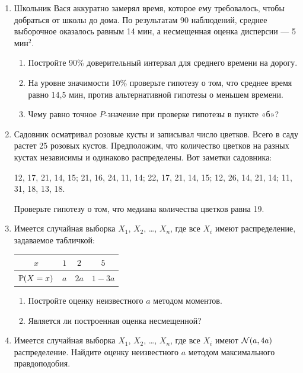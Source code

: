 \begin{enumerate}
\item Школьник Вася аккуратно замерял время, которое ему требовалось, чтобы добраться от школы до дома. По результатам 90 наблюдений, среднее выборочное оказалось равным 14 мин, а несмещенная оценка дисперсии — 5 мин$^{2}$.
\begin{enumerate}
\item Постройте 90\% доверительный интервал для среднего времени на дорогу.
\item На уровне значимости 10\% проверьте гипотезу о том, что среднее время равно 14,5 мин, против альтернативной гипотезы о меньшем времени.
\item Чему равно точное $P$-значение при проверке гипотезы в пункте «б»?
\end{enumerate}

\item Садовник осматривал розовые кусты и записывал число цветков. Всего в саду растет 25 розовых кустов. Предположим, что количество цветков на разных кустах независимы и одинаково распределены.
Вот заметки садовника:

12, 17, 21, 14, 15; 21, 16, 24, 11, 14; 22, 17, 21, 14, 15; 12, 26, 14, 21, 14; 11, 31, 18, 13, 18.

Проверьте гипотезу о том, что медиана количества цветков равна 19.

\item Имеется случайная выборка $X_{1}$, $X_{2}$, \ldots, $X_{n}$, где все $X_{i}$ имеют распределение, задаваемое табличкой:

\begin{tabular}{@{}cccc@{}}
\toprule
$x$         & $1$ & $2$  & $5$    \\ \midrule
$\P(X=x)$ & $a$ & $2a$ & $1-3a$ \\ \bottomrule
\end{tabular}
\begin{enumerate}
\item Постройте оценку неизвестного $a$ методом моментов.
\item Является ли построенная оценка несмещенной?
\end{enumerate}

\item Имеется случайная выборка $X_{1}$, $X_{2}$, \ldots, $X_{n}$, где все $X_{i}$ имеют $\cN(a,4a)$ распределение.
Найдите оценку неизвестного $a$ методом максимального правдоподобия.


\end{enumerate}
